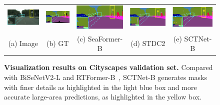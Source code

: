 \documentclass[letterpaper]{article} %
\begin{document}
\begin{figure}[t]
\begin{tabular}{ccccc}
\includegraphics[width=0.19\linewidth]{image/supp/figure6/3a.png}\label{city_3a} &
\hspace{-12pt}
\includegraphics[width=0.19\linewidth]{image/supp/figure6/3b.png}\label{city_3b} &
\hspace{-12pt}
\includegraphics[width=0.19\linewidth]{image/supp/figure6/3c.png}\label{city_3c} &
\hspace{-12pt}
\includegraphics[width=0.19\linewidth]{image/supp/figure6/3d.png}\label{city_3d} &
\hspace{-12pt}
\includegraphics[width=0.19\linewidth]{image/supp/figure6/3e.png}\label{city_3e} \\
(a) Image & (b) GT & (c) SeaFormer-B & (d) STDC2& (e) SCTNet-B\\
\end{tabular}
\caption{\textbf{Visualization results on Cityscapes validation set.} Compared with BiSeNetV2-L\cite{yu2021bisenet} and RTFormer-B~\cite{wang2022rtformer}, SCTNet-B generates masks with finer details as highlighted in the light blue box and more accurate large-area predictions, as highlighted in the yellow box.}
\label{suppfig:vis_cityscapes}

\vspace{-10pt}
\end{figure}
\end{document}
